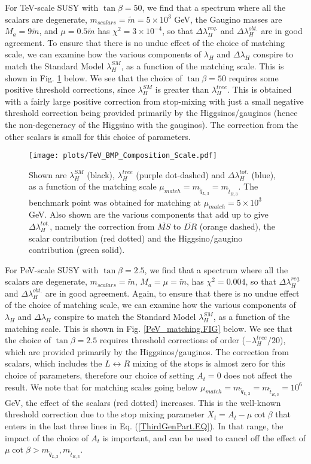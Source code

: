 \documentclass[12pt]{article}
\newcommand{\sq}{\tilde{q}}
\newcommand{\mStL}{m_{\sq_{L,3}}}
\newcommand{\mStR}{m_{\tilde{t}_{R,3}}}
\newcommand{\MS}{\overline{MS}}
\newcommand{\DR}{\overline{DR}}
\newcommand{\mS}{\tilde{m}}
\begin{document}
For TeV-scale SUSY with $\tan\beta=50$, we find that a spectrum where all the scalars are degenerate, $m_{scalars}=\mS =5\times10^3$ GeV, the Gaugino masses are $M_a = 9\mS$, and $\mu = 0.5 \mS$ has $\chi^2=3\times10^{-4}$, so that $\Delta\lambda_H^{req.}$ and $\Delta\lambda_H^{obt.}$ are in good agreement. To ensure that there is no undue effect of the choice of matching scale, we can examine how the various components of $\lambda_H$ and $\Delta\lambda_H$ conspire to match the Standard Model $\lambda_H^{SM}$, as a function of the matching scale. This is shown in Fig. \ref{TeV_matching.FIG} below. We see that the choice of $\tan\beta=50$ requires some positive threshold corrections, since $\lambda_H^{SM}$ is greater than $\lambda_H^{tree}$. This is obtained with a fairly large positive correction from stop-mixing with just a small negative threshold correction being provided primarily by the Higgsinos/gauginos (hence the non-degeneracy of the Higgsino with the gauginos). The correction from the other scalars
is small for this choice of parameters.

\begin{figure}[t]
\centering
\texttt{[image: plots/TeV\_BMP\_Composition\_Scale.pdf]}
\caption{Shown are $\lambda_H^{SM}$ (black), $\lambda_H^{tree}$ (purple dot-dashed) and $\Delta\lambda_H^{tot.}$ (blue), as a function of the matching scale $\mu_{match}= \mStL =\mStR$. The benchmark point was obtained for matching at $\mu_{match}=5\times10^3$ GeV. Also shown are the various components that add up to give $\Delta\lambda_H^{tot.}$, namely the correction from $\MS$ to $\DR$ (orange dashed), the scalar contribution (red dotted) and the Higgsino/gaugino contribution (green solid).}
\label{TeV_matching.FIG}
\end{figure}

For PeV-scale SUSY with $\tan\beta=2.5$, we find that a spectrum where all the scalars are degenerate, $m_{scalars}=\mS$, $M_a = \mu = \mS$, has $\chi^2=0.004$, so that $\Delta\lambda_H^{req.}$ and $\Delta\lambda_H^{obt.}$ are in good agreement. Again, to ensure that there is no undue effect of the choice of matching scale, we can examine how the various components of $\lambda_H$ and $\Delta\lambda_H$ conspire to match the Standard Model $\lambda_H^{SM}$, as a function of the matching scale. This is shown in Fig. \ref{PeV_matching.FIG} below. We see that the choice of $\tan\beta=2.5$ requires threshold corrections of order ($-\lambda^{tree}_H/20$), which are provided primarily by the Higgsinos/gauginos. The correction from scalars, which includes the $L\leftrightarrow R$ mixing of the stops is almost zero for this choice of parameters, therefore our choice of setting $A_t=0$ does not affect the result. We note that for matching scales going below $\mu_{match}= \mStL =\mStR=10^6$ GeV, the effect of the scalars (red dotted) increases. This is the well-known threshold correction due to the stop mixing parameter $X_t = A_t - \mu \cot\beta$ that enters in the last three lines in Eq. (\ref{ThirdGenPart.EQ}). In that range, the impact of the choice of $A_t$ is important, and can be used to cancel off the effect of $\mu\cot\beta > \mStL,\mStR$.
\end{document}
